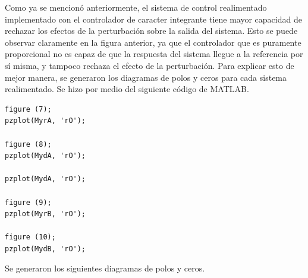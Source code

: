 Como ya se mencionó anteriormente, el sistema de control realimentado implementado con el controlador de caracter integrante tiene mayor capacidad de rechazar los efectos de la perturbación sobre la salida del sistema. Esto se puede observar claramente en la figura anterior, ya que el controlador que es puramente proporcional no es capaz de que la respuesta del sistema llegue a la referencia por sí misma, y tampoco rechaza el efecto de la perturbación. Para explicar esto de mejor manera, se generaron los diagramas de polos y ceros para cada sistema realimentado. Se hizo por medio del siguiente código de MATLAB.

\vspace{1em}
\begin{mdframed}
\begin{verbatim}
figure (7);
pzplot(MyrA, 'rO');

figure (8);
pzplot(MydA, 'rO');

pzplot(MydA, 'rO');

figure (9);
pzplot(MyrB, 'rO');

figure (10);
pzplot(MydB, 'rO');
\end{verbatim}
\end{mdframed}

\newpage

Se generaron los siguientes diagramas de polos y ceros.

